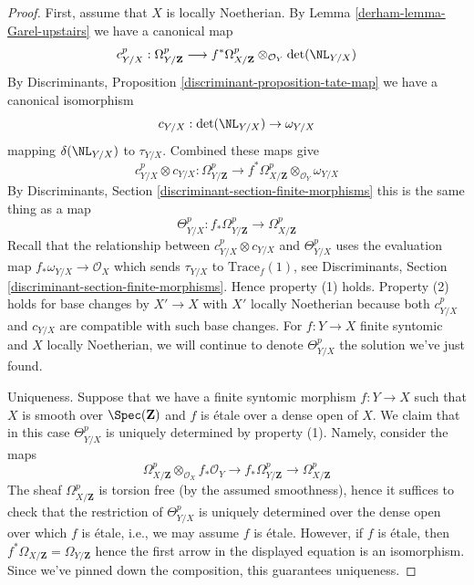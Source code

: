 \begin{proof}

First, assume that $X$ is locally Noetherian. By
Lemma \ref{derham-lemma-Garel-upstairs} we have a canonical map
$$
c^p_{Y/X} : \Omega_{Y/\mathbf{Z}}^p
\longrightarrow
f^*\Omega_{X/\mathbf{Z}}^p \otimes_{\mathcal{O}_Y} \det(\NL_{Y/X})
$$
By Discriminants, Proposition \ref{discriminant-proposition-tate-map}
we have a canonical isomorphism
$$
c_{Y/X} : \det(\NL_{Y/X}) \to \omega_{Y/X}
$$
mapping $\delta(\NL_{Y/X})$ to $\tau_{Y/X}$. Combined these maps give
$$
c^p_{Y/X} \otimes c_{Y/X} :
\Omega_{Y/\mathbf{Z}}^p
\longrightarrow
f^*\Omega_{X/\mathbf{Z}}^p \otimes_{\mathcal{O}_Y} \omega_{Y/X}
$$
By Discriminants, Section \ref{discriminant-section-finite-morphisms}
this is the same thing as a map
$$
\Theta_{Y/X}^p :
f_*\Omega_{Y/\mathbf{Z}}^p
\longrightarrow
\Omega_{X/\mathbf{Z}}^p
$$
Recall that the relationship between $c^p_{Y/X} \otimes c_{Y/X}$
and $\Theta_{Y/X}^p$ uses the evaluation map
$f_*\omega_{Y/X} \to \mathcal{O}_X$
which sends $\tau_{Y/X}$ to $\text{Trace}_f(1)$, see
Discriminants, Section \ref{discriminant-section-finite-morphisms}.
Hence property (1) holds. Property (2) holds for base changes by
$X' \to X$ with $X'$ locally Noetherian because both $c^p_{Y/X}$ and
$c_{Y/X}$ are compatible with such base changes. For $f : Y \to X$
finite syntomic and $X$ locally Noetherian,
we will continue to denote $\Theta^p_{Y/X}$ the solution we've just found.

\medskip\noindent
Uniqueness. Suppose that we have a finite syntomic morphism
$f: Y \to X$ such that $X$ is smooth over $\Spec(\mathbf{Z})$
and $f$ is \'etale over a dense open of $X$. We claim that
in this case $\Theta^p_{Y/X}$ is uniquely determined by property (1).
Namely, consider the maps
$$
\Omega^p_{X/\mathbf{Z}} \otimes_{\mathcal{O}_X} f_*\mathcal{O}_Y \to
f_*\Omega^p_{Y/\mathbf{Z}} \to
\Omega^p_{X/\mathbf{Z}}
$$
The sheaf $\Omega^p_{X/\mathbf{Z}}$ is torsion free (by the assumed
smoothness), hence it suffices to check that the restriction of
$\Theta^p_{Y/X}$ is uniquely determined over the dense open over
which $f$ is \'etale, i.e., we may assume $f$ is \'etale.
However, if $f$ is \'etale, then
$f^*\Omega_{X/\mathbf{Z}} = \Omega_{Y/\mathbf{Z}}$
hence the first arrow in the displayed equation is an isomorphism.
Since we've pinned down the composition, this guarantees uniqueness.


\end{proof}

